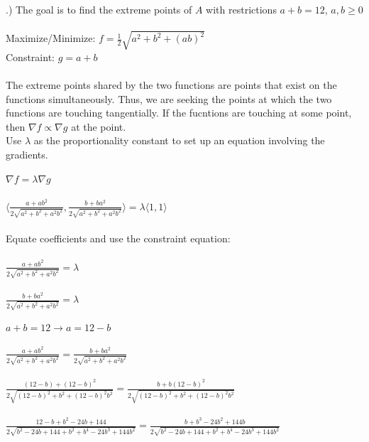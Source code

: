 \documentclass[12pt]{article}
\begin{document}
.) The goal is to find the extreme points of $A$ with restrictions $a+b = 12$, \hspace{10pt} $a,b \geq 0$\\\\
\noindent Maximize/Minimize: $f = \frac{1}{2}\sqrt{a^{2} + b^{2} + (ab)^{2}}$\\
\noindent Constraint: $g = a + b$\\\\
\noindent The extreme points shared by the two functions are points that exist on the functions simultaneously. Thus, 
we are seeking the points at which the two functions are touching tangentially. If the fucntions are touching at some point, then $\nabla f \propto \nabla g$ at the point.\\
\noindent Use $\lambda$ as the proportionality constant to set up an equation involving the gradients.\\\\
\noindent $\nabla f = \lambda \nabla g$\\\\
\noindent $\langle \frac{a + ab^{2}}{2\sqrt{a^{2} + b^{2} + a^{2}b^{2}}},\frac{b + ba^{2}}{2\sqrt{a^{2} + b^{2} + a^{2}b^{2}}} \rangle = \lambda \langle 1, 1\rangle$\\\\
\noindent Equate coefficients and use the constraint equation: \\\\
\noindent $\frac{a + ab^{2}}{2\sqrt{a^{2} + b^{2} + a^{2}b^{2}}} = \lambda$\\\\
\noindent $\frac{b + ba^{2}}{2\sqrt{a^{2} + b^{2} + a^{2}b^{2}}} = \lambda$\\\\
\noindent $a + b = 12 \rightarrow a = 12 - b$\\\\
\noindent $\frac{a + ab^{2}}{2\sqrt{a^{2} + b^{2} + a^{2}b^{2}}} =\frac{b + ba^{2}}{2\sqrt{a^{2} + b^{2} + a^{2}b^{2}}}$\\\\
\noindent $\frac{(12-b) + (12-b)^{2}}{2\sqrt{(12-b)^{2} + b^{2} + (12-b)^{2}b^{2}}} =\frac{b + b(12-b)^{2}}{2\sqrt{(12-b)^{2} + b^{2} + (12-b)^{2}b^{2}}}$\\\\
\noindent $\frac{12-b + b^{2}-24b + 144}{2\sqrt{b^{2}-24b+144 + b^{2} + b^{4}-24b^{3}+144b^{2}}} =\frac{b + b^{3} -24b^{2} + 144b}{2\sqrt{b^{2}-24b + 144 + b^{2} + b^{4}-24b^{3}+144b^{2}}}$\\\\
\end{document}
